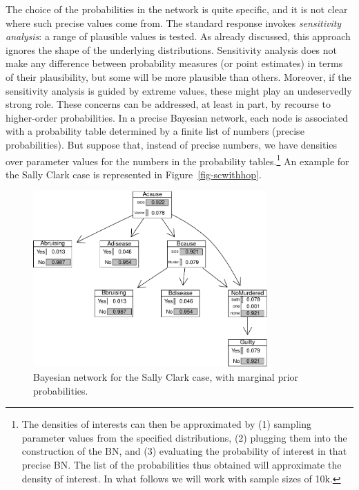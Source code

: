 \documentclass[
  letterpaper,
  DIV=11,
  numbers=noendperiod]{scrartcl}
\begin{document}
The choice of the probabilities in the network is quite specific, and it
is not clear where such precise values come from. The standard response
invokes \emph{sensitivity analysis}: a range of plausible values is
tested. As already discussed, this approach ignores the shape of the
underlying distributions. Sensitivity analysis does not make any
difference between probability measures (or point estimates) in terms of
their plausibility, but some will be more plausible than others.
Moreover, if the sensitivity analysis is guided by extreme values, these
might play an undeservedly strong role. These concerns can be addressed,
at least in part, by recourse to higher-order probabilities. In a
precise Bayesian network, each node is associated with a probability
table determined by a finite list of numbers (precise probabilities).
But suppose that, instead of precise numbers, we have densities over
parameter values for the numbers in the probability tables.\footnote{The
  densities of interests can then be approximated by (1) sampling
  parameter values from the specified distributions, (2) plugging them
  into the construction of the BN, and (3) evaluating the probability of
  interest in that precise BN. The list of the probabilities thus
  obtained will approximate the density of interest. In what follows we
  will work with sample sizes of 10k.} An example for the Sally Clark
case is represented in Figure~\ref{fig-scwithhop}.

\begin{figure}[H]

{\centering \includegraphics[width=0.8\textwidth,height=\textheight]{imp_philosophical_backup_files/figure-pdf/fig-scbnplot-1.pdf}

}

\caption{\label{fig-scbnplot}Bayesian network for the Sally Clark case,
with marginal prior probabilities.}

\end{figure}
\end{document}
